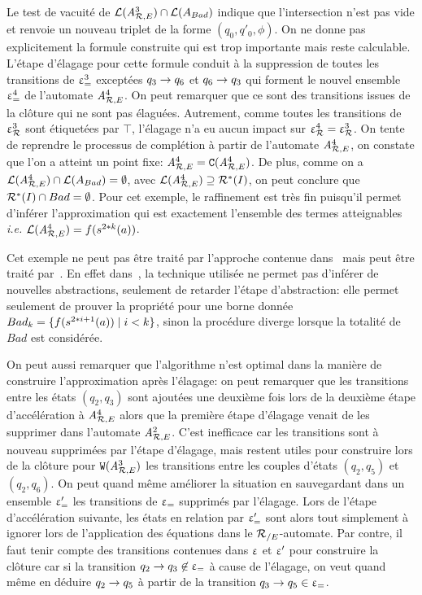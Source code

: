 Le test de vacuité de $\mathcal{L}({\mathit A}_{\mathcal R,E}^3) \cap \mathcal{L}(A_{Bad})$ indique
que l'intersection n'est pas vide et renvoie un nouveau triplet de la forme $(q_0,q'_0,\phi)$.
On ne donne pas explicitement la formule construite qui est trop importante
mais reste calculable. L'étape d'élagage pour cette formule conduit à
la suppression de toutes les transitions de $\upvarepsilon_{=}^3$ exceptées 
$q_3\rightarrow q_6$ et $q_6\rightarrow q_3$ qui forment le nouvel ensemble $\upvarepsilon_{=}^4$
de l'automate ${\mathit A}_{\mathcal R,E}^4$. On peut remarquer que ce sont des transitions 
issues de la clôture qui ne sont pas élaguées.
Autrement, comme toutes les transitions de $\upvarepsilon_{\mathcal R}^3$ 
sont étiquetées par $\top$, l'élagage n'a eu aucun impact sur $\upvarepsilon_{\mathcal R}^4 = \upvarepsilon_{\mathcal R}^3$.
On tente de reprendre le processus de complétion à partir de l'automate ${\mathit A}_{\mathcal R,E}^4$,
on constate que l'on a atteint  un point fixe: ${\mathit A}_{\mathcal R,E}^4=\mathtt{C}({\mathit A}_{\mathcal R,E}^4)$. 
De plus, comme on a $\mathcal{L}({\mathit A}_{\mathcal R,E}^4)\cap \mathcal{L}(A_{Bad})=\emptyset$,
avec $\mathcal{L}({\mathit A}_{\mathcal R,E}^4) \supseteq \mathcal R^*(I)$, on peut conclure que 
$\mathcal R^*(I) \cap Bad=\emptyset$. Pour cet exemple, le raffinement est très fin
puisqu'il permet d'inférer l'approximation qui est exactement l'ensemble
des termes atteignables \textit{i.e.}  $\mathcal{L}({\mathit A}_{\mathcal R,E}^4)=f(s^{2*k}(a))$.

\begin{remark}
Cet exemple ne peut pas être traité par l'approche contenue dans~\cite{BCHK08} mais peut être traité
par~\cite{BouajjaniHRV-SAS06}. En effet dans~\cite{BCHK08}, la technique utilisée ne permet
pas d'inférer de nouvelles abstractions, seulement de retarder l'étape d'abstraction:
elle permet seulement de prouver la propriété pour une borne donnée $Bad_k = \{ f(s^{2*i +1}(a)) \; | \; i < k\}$,
sinon la procédure diverge lorsque la totalité de $Bad$ est considérée.
\end{remark}

\begin{remark}
  On peut aussi remarquer que l'algorithme n'est optimal dans la manière de construire l'approximation après 
  l'élagage: on peut remarquer que les transitions entre les états $(q_2, q_3)$ sont ajoutées une deuxième fois
  lors de la deuxième étape d'accélération à ${\mathit A}_{\mathcal R,E}^4$ alors que la première étape d'élagage venait de les supprimer
  dans l'automate ${\mathit A}_{\mathcal R,E}^2$. C'est inefficace car les transitions sont à nouveau supprimées par l'étape d'élagage, mais
  restent utiles pour construire lors de la clôture pour $\mathtt{W}({\mathit A}_{\mathcal R,E}^3)$ les transitions entre les couples d'états
  $(q_2,q_5)$ et $(q_2,q_6)$. On peut quand même améliorer la situation en sauvegardant dans un ensemble $\upvarepsilon_{=}'$ les transitions
  de $\upvarepsilon_{=}$ supprimés par l'élagage. Lors de l'étape d'accélération suivante, les états en relation par $\upvarepsilon_{=}'$ sont alors 
  tout simplement à ignorer lors de l'application des équations dans le ${\mathcal R_{/E}}$-automate. Par contre, il faut tenir compte
  des transitions contenues dans $\upvarepsilon$ et $\upvarepsilon'$ pour construire la clôture car si la transition $q_2 \rightarrow q_3 \not\in \upvarepsilon_{=}$
  à cause de l'élagage, on veut quand même en déduire $q_2 \rightarrow q_5$ à partir de la transition $q_3 \rightarrow q_5 \in \upvarepsilon_{=}$.
\end{remark}


